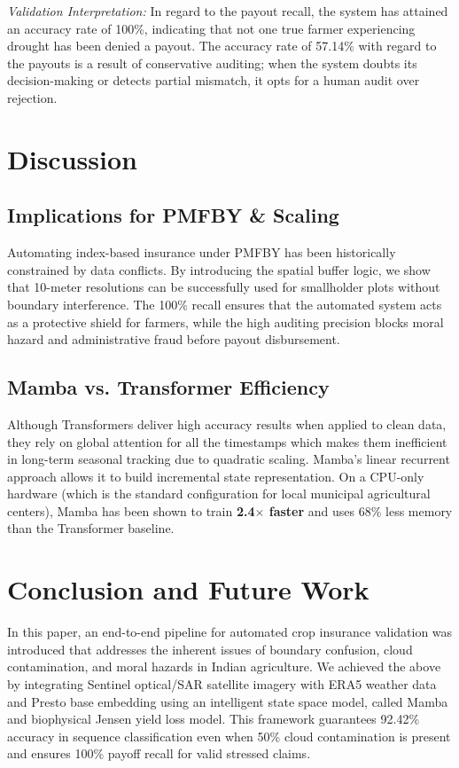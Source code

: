 \documentclass[conference]{IEEEtran}
\begin{document}
\textit{Validation Interpretation:} In regard to the payout recall, the system has attained an accuracy rate of 100\%, indicating that not one true farmer experiencing drought has been denied a payout. The accuracy rate of 57.14\% with regard to the payouts is a result of conservative auditing; when the system doubts its decision-making or detects partial mismatch, it opts for a human audit over rejection.

\section{Discussion}

\subsection{Implications for PMFBY \& Scaling}
Automating index-based insurance under PMFBY has been historically constrained by data conflicts. By introducing the spatial buffer logic, we show that 10-meter resolutions can be successfully used for smallholder plots without boundary interference. The 100\% recall ensures that the automated system acts as a protective shield for farmers, while the high auditing precision blocks moral hazard and administrative fraud before payout disbursement.

\subsection{Mamba vs. Transformer Efficiency}
Although Transformers deliver high accuracy results when applied to clean data, they rely on global attention for all the timestamps which makes them inefficient in long-term seasonal tracking due to quadratic scaling. Mamba's linear recurrent approach allows it to build incremental state representation. On a CPU-only hardware (which is the standard configuration for local municipal agricultural centers), Mamba has been shown to train \textbf{2.4$\times$ faster} and uses 68\% less memory than the Transformer baseline.


\section{Conclusion and Future Work}
In this paper, an end-to-end pipeline for automated crop insurance validation was introduced that addresses the inherent issues of boundary confusion, cloud contamination, and moral hazards in Indian agriculture. We achieved the above by integrating Sentinel optical/SAR satellite imagery with ERA5 weather data and Presto base embedding using an intelligent state space model, called Mamba and biophysical Jensen yield loss model. This framework guarantees 92.42\% accuracy in sequence classification even when 50\% cloud contamination is present and ensures 100\% payoff recall for valid stressed claims.
\end{document}
